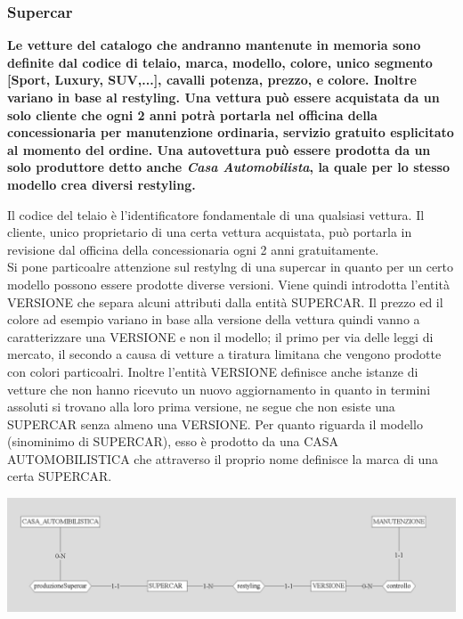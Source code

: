 \documentclass[12pt]{article}
\begin{document}
\subsubsection{Supercar}
\textbf{Le vetture del catalogo che andranno mantenute in memoria sono definite
dal codice di telaio, marca, modello, colore, unico segmento [Sport, Luxury,
SUV,...], cavalli potenza, prezzo, e colore. Inoltre variano in base al
restyling. Una vettura può essere acquistata da un solo cliente che ogni 2 anni
potrà portarla nel officina della concessionaria per manutenzione ordinaria,
servizio gratuito esplicitato al momento del ordine. Una autovettura può essere
prodotta da un solo produttore detto anche \textit{Casa Automobilista}, la quale
per lo stesso modello crea diversi restyling.}

Il codice del telaio è l'identificatore fondamentale di una qualsiasi vettura.
Il cliente, unico proprietario di una certa vettura acquistata, può portarla in
revisione dal officina della concessionaria ogni 2 anni gratuitamente.\\
Si pone particoalre attenzione sul restylng di una supercar in quanto per un
certo modello possono essere prodotte diverse versioni. Viene quindi introdotta
l'entità VERSIONE che separa alcuni attributi dalla entità SUPERCAR. Il prezzo
ed il colore ad esempio variano in base alla versione della vettura quindi vanno
a caratterizzare una VERSIONE e non il modello; il primo per via delle leggi di
mercato, il secondo a causa di vetture a tiratura limitana che vengono prodotte
con colori particoalri. Inoltre l'entità VERSIONE definisce anche istanze di
vetture che non hanno ricevuto un nuovo aggiornamento in quanto in termini
assoluti si trovano alla loro prima versione, ne segue che non esiste una
SUPERCAR senza almeno una VERSIONE. Per quanto riguarda il modello (sinominimo
di SUPERCAR), esso è prodotto da una CASA AUTOMOBILISTICA che attraverso il
proprio nome definisce la marca di una certa SUPERCAR.

\begin{center}
    \includegraphics[width=\linewidth]{images/versione.png}
\end{center}
\end{document}
